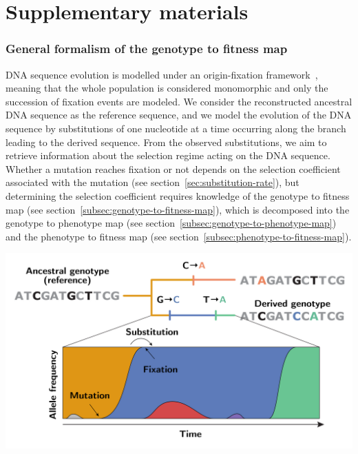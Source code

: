 \documentclass{article}
\begin{document}
    \part*{Supplementary materials}
    \tableofcontents
    \newpage

    \section{General formalism of the genotype to fitness map}\label{sec:general-formalism}

    DNA sequence evolution is modelled under an origin-fixation framework~\cite{mccandlish_modeling_2014}, meaning that the whole population is considered monomorphic and only the succession of fixation events are modeled.
    We consider the reconstructed ancestral DNA sequence as the reference sequence, and we model the evolution of the DNA sequence by substitutions of one nucleotide at a time occurring along the branch leading to the derived sequence.
    From the observed substitutions, we aim to retrieve information about the selection regime acting on the DNA sequence.
    Whether a mutation reaches fixation or not depends on the selection coefficient associated with the mutation (see section~\ref{sec:substitution-rate}), but determining the selection coefficient requires knowledge of the genotype to fitness map (see section~\ref{subsec:genotype-to-fitness-map}), which is decomposed into the genotype to phenotype map (see section~\ref{subsec:genotype-to-phenotype-map}) and the phenotype to fitness map (see section~\ref{subsec:phenotype-to-fitness-map}).

    \begin{center}
        \includegraphics[width=0.6\linewidth, page=1]{substitutions.pdf}
        \label{fig:substitutions}
    \end{center}
\end{document}
